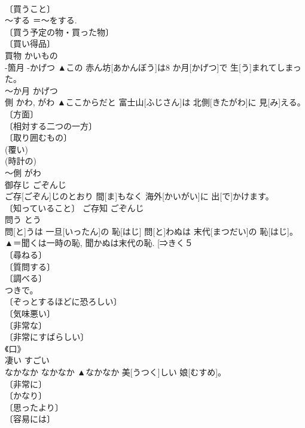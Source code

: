 \documentclass[8pt]{extreport}
\begin{document}
\begin{CJK}{UTF8}{min}
\\	〔買うこと〕 
\\	～する ＝～をする. 
\\	〔買う予定の物・買った物〕 
\\	〔買い得品〕 
\\	買物	かいもの	
\\	-箇月	-かげつ	▲この 赤ん坊[あかんぼう]は8 か月[かげつ]で 生[う]まれてしまった。	
\\	〜か月	かげつ	
\\	側	かわ, がわ	▲ここからだと 富士山[ふじさん]は 北側[きたがわ]に 見[み]える。	
\\	〔方面〕 
\\	〔相対する二つの一方〕 
\\	〔取り囲むもの〕 
\\	(覆い) 
\\	(時計の) 
\\	〜側	がわ	
\\	御存じ	ごぞんじ	
\\	ご存[ごぞん]じのとおり 間[ま]もなく 海外[かいがい]に 出[で]かけます。	
\\	〔知っていること〕	ご存知	ごぞんじ	
\\	問う	とう	
\\	問[と]うは 一旦[いったん]の 恥[はじ] 問[と]わぬは 末代[まつだい]の 恥[はじ]。	▲＝聞くは一時の恥, 聞かぬは末代の恥. [⇒きく５ 
\\	〔尋ねる〕 
\\	〔質問する〕 
\\	〔調べる〕 
\\	[＝きく５ 
\\	〔問題にする〕 
\\	〔追及する〕 
\\	〔罪に問う〕 
\\	答	とう	
\\	すごい	すごい	▲すごい 目[め]つきで。	
\\	〔ぞっとするほどに恐ろしい〕 
\\	〔気味悪い〕 
\\	〔非常な〕 
\\	〔非常にすばらしい〕 
\\	《口》 
\\	凄い	すごい	
\\	なかなか	なかなか	▲なかなか 美[うつく]しい 娘[むすめ]。	
\\	〔非常に〕 
\\	〔かなり〕 
\\	〔思ったより〕 
\\	〔容易には〕 

\end{CJK}
\end{document}
